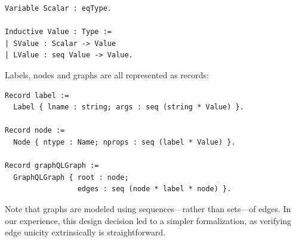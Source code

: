 \begin{verbatim}
Variable Scalar : eqType.

Inductive Value : Type :=
| SValue : Scalar -> Value 
| LValue : seq Value -> Value.
\end{verbatim}

Labels, nodes and graphs are all represented as records:

\begin{verbatim}
Record label := 
  Label { lname : string; args : seq (string * Value) }.

Record node := 
  Node { ntype : Name; nprops : seq (label * Value) }.

Record graphQLGraph := 
  GraphQLGraph { root : node; 
                 edges : seq (node * label * node) }.
\end{verbatim}


Note that graphs are modeled using sequences---rather than sets---of edges. 
In our experience, this design decision led to a simpler
formalization, as verifying edge unicity extrinsically is straightforward.  



	
		
